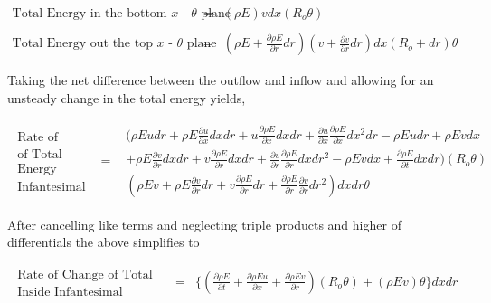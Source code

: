 \begin{displaymath}
	\begin{array}{ccc}
		\textrm{Total Energy in the bottom $x$ - $\theta$ plane} & = & 
		(\rho E)v dx(R_o \theta) \\ & & \\
		\textrm{Total Energy out the top $x$ - $\theta$ plane} & = &
		(\rho E + \frac{\partial \rho E}{\partial r}dr)(v + \frac{\partial v}{\partial r}dr)dx(R_o + dr)\theta
	\end{array}
\end{displaymath}

	Taking the net difference between the outflow and inflow and allowing for an unsteady change in the total energy
yields,

\begin{displaymath}
	\begin{array}{ccc}
		\begin{array}{c}
		\textrm{Rate of Change} \\ \textrm{of Total} \\ \textrm{Energy Inside} \\ \textrm{Infantesimal Volume}
		\end{array} & = &
		\begin{array}{c}
		(\rho E u dr + \rho E \frac{\partial u}{\partial x}dxdr + u \frac{\partial \rho E}{\partial x}dxdr +
		\frac{\partial u}{\partial x} \frac{\partial \rho E}{\partial x}dx^2dr - \rho E u dr + \rho E v dx \\
		+ \rho E \frac{\partial v}{\partial r}dxdr + v \frac{\partial \rho E}{\partial r}dxdr +
		\frac{\partial v}{\partial r} \frac{\partial \rho E}{\partial r}dxdr^2 - \rho E v dx  + \frac{\partial \rho E}
		{\partial t}dxdr)(R_o \theta) \\
		(\rho E v + \rho E \frac{\partial v}{\partial r}dr + v \frac{\partial \rho E}{\partial r}dr +
		\frac{\partial \rho E}{\partial r}\frac{\partial v}{\partial r}dr^2)dxdr \theta
		\end{array}
	\end{array}
\end{displaymath}

	After cancelling like terms and neglecting triple products and higher of differentials the above simplifies to

\begin{displaymath}
	\begin{array}{ccc}
		\begin{array}{c}
		\textrm{Rate of Change of Total Energy} \\ \textrm{Inside Infantesimal Volume}
		\end{array} & = &
		\Big\{( \frac{\partial \rho E}{\partial t} +\frac{\partial \rho E u}{\partial x} + \frac{\partial \rho E v}
		{\partial r})(R_o \theta) + (\rho E v)\theta \Big\}dxdr
	\end{array}
\end{displaymath}

